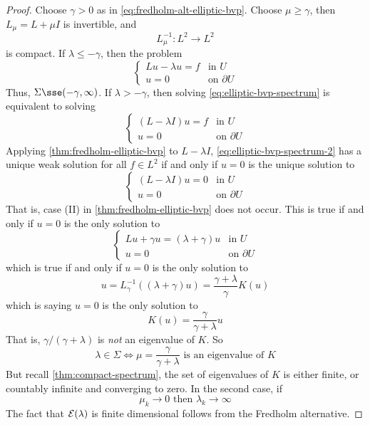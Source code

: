 \documentclass{article}
\begin{document}
\begin{proof}
    Choose \(\gamma > 0\) as in \cref{eq:fredholm-alt-elliptic-bvp}. Choose \(\mu \ge \gamma\), then \(L_\mu = L + \mu I\) is invertible, and
    \[L_\mu^{-1} : L^2 \to L^2\]
    is compact. If \(\lambda \le -\gamma\), then the problem
    \[\begin{cases}
        Lu - \lambda u = f & \text{in }U \\
        u = 0&\text{on }\partial U
    \end{cases}\]
    Thus, \(\Sigma \sse (-\gamma, \infty)\). If \(\lambda > -\gamma\), then solving \cref{eq:elliptic-bvp-spectrum} is equivalent to solving
    \begin{equation}
        \label{eq:elliptic-bvp-spectrum-2}
        \begin{cases}
            (L - \lambda I)u = f &\text{in }U \\
            u = 0 &\text{on }\partial U
        \end{cases}
    \end{equation}
    Applying \cref{thm:fredholm-elliptic-bvp} to \(L - \lambda I\), \cref{eq:elliptic-bvp-spectrum-2} has a unique weak solution for all \(f \in L^2\) if and only if \(u = 0\) is the unique solution to
    \[\begin{cases}
        (L - \lambda I)u = 0 &\text{in }U \\
        u = 0 &\text{on }\partial U
    \end{cases}\]
    That is, case (II) in \cref{thm:fredholm-elliptic-bvp} does not occur. This is true if and only if \(u = 0\) is the only solution to
    \[\begin{cases}
        Lu + \gamma u = (\lambda + \gamma)u &\text{in }U \\
        u = 0 &\text{on }\partial U
    \end{cases}\]
    which is true if and only if \(u =0\) is the only solution to
    \[u = L_\gamma^{-1}((\lambda + \gamma)u) = \frac{\gamma + \lambda}{\gamma}K(u)\]
    which is saying \(u = 0\) is the only solution to
    \[K(u) = \frac{\gamma}{\gamma + \lambda}u\]
    That is, \(\gamma/(\gamma + \lambda)\) is \emph{not} an eigenvalue of \(K\). So
    \[\lambda \in \Sigma \iff \mu = \frac{\gamma}{\gamma + \lambda}\text{ is an eigenvalue of }K\]
    But recall \cref{thm:compact-spectrum}, the set of eigenvalues of \(K\) is either finite, or countably infinite and converging to zero. In the second case, if
    \[\mu_k \to 0 \text{ then }\lambda_k \to \infty\]
    The fact that \(\mathcal{E}(\lambda)\) is finite dimensional follows from the Fredholm alternative.
\end{proof}
\end{document}
